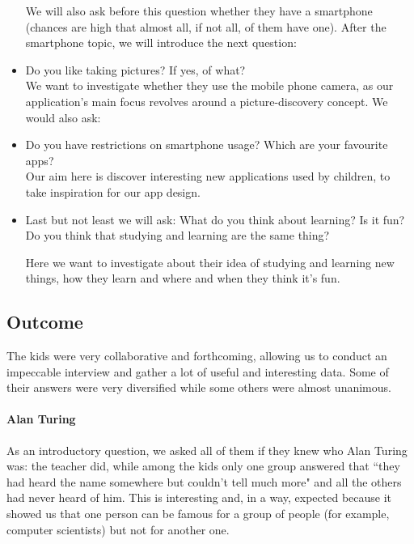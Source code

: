 \documentclass[12pt]{scrartcl}
\begin{document}
\begin{itemize}
		We will also ask before this question whether they have a smartphone (chances are high that 
		almost all, if not all, of them have one). After the smartphone topic, we will introduce the  next question:

		\item Do you like taking pictures? If yes, of what?\\
		We want to investigate whether they use the mobile phone camera, as our application's main 
		focus revolves around a picture-discovery concept. We would also ask:

		\item Do you have restrictions on smartphone usage? Which are your favourite apps?\\
		Our aim here is discover interesting new applications used by children, to take inspiration for 
		our app design.

		\item Last but not least we will ask: What do you think about learning? Is it fun? 
		Do you think that studying and learning are the same thing?

		Here we want to investigate about their idea of studying and learning new things, how they 
		learn and where and when they think it's fun.
	\end{itemize}
		
	\subsection*{Outcome}
		The kids were very collaborative and forthcoming, allowing us to conduct an impeccable interview and gather a lot of useful and interesting data. Some of their answers were very diversified while some others were almost unanimous.
		
		\paragraph{Alan Turing} As an introductory question, we asked all of them if they knew who Alan Turing was: the teacher did, while among the kids only one group answered that ``they had heard the name somewhere but couldn't tell much more" and all the others had never heard of him. This is interesting and, in a way, expected because it showed us that one person can be famous for a group of people (for example, computer scientists) but not for another one.
		
\end{document}
